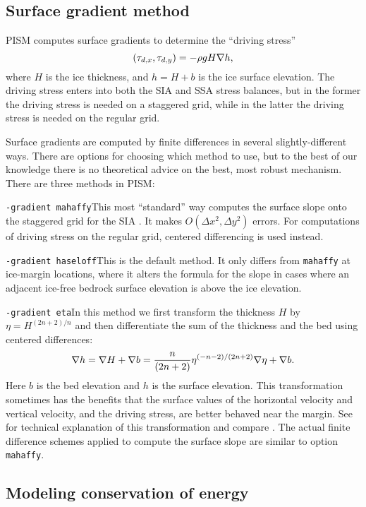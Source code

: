 \clearpage

\subsection{Surface gradient method}
\label{subsect:gradient}

PISM computes surface gradients to determine the ``driving stress''
	$$(\tau_{d,x},\tau_{d,y}) = - \rho g H \nabla h,$$
where $H$ is the ice thickness, and $h = H+b$ is the ice surface elevation.  The driving stress enters into both the SIA and SSA stress balances, but in the former the driving stress is needed on a staggered grid, while in the latter the driving stress is needed on the regular grid.

Surface gradients are computed by finite differences in several slightly-different ways.  There are options for choosing which method to use, but to the best of our knowledge there is no theoretical advice on the best, most robust mechanism.  There are three  methods in PISM:

\noindent\texttt{-gradient mahaffy}\quad  This most ``standard'' way computes the surface slope onto the staggered grid for the SIA \cite{Mahaffy}.  It makes $O(\Delta x^2,\Delta y^2)$ errors.  For computations of driving stress on the regular grid, centered differencing is used instead.

\noindent\texttt{-gradient haseloff}\quad  This is the default method.  It only differs from \texttt{mahaffy} at ice-margin locations, where it alters the formula for the slope in cases where an adjacent ice-free bedrock surface elevation is above the ice elevation.

\noindent\texttt{-gradient eta}\quad  In this method we first transform the thickness $H$ by $\eta = H^{(2n+2)/n}$ and then differentiate the sum of the thickness and the bed using centered differences:
	$$\nabla h = \nabla H + \nabla b = \frac{n}{(2n+2)} \eta^{(-n-2)/(2n+2)} \nabla \eta + \nabla b.$$
Here $b$ is the bed elevation and $h$ is the surface elevation.  This transformation sometimes has the benefits that the surface values of the horizontal velocity and vertical velocity, and the driving stress, are better behaved near the margin.  See \cite{BLKCB} for technical explanation of this transformation and compare \cite{SaitoMargin}.  The actual finite difference schemes applied to compute the surface slope are similar to option \texttt{mahaffy}.


\subsection{Modeling conservation of energy} \label{subsect:energy}

